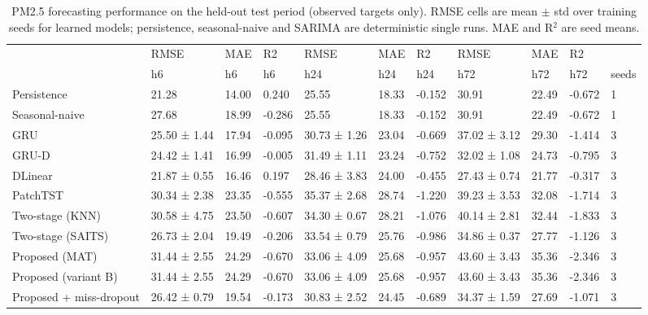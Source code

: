 \begin{table}
\caption{PM2.5 forecasting performance on the held-out test period (observed targets only). RMSE cells are mean $\pm$ std over training seeds for learned models; persistence, seasonal-naive and SARIMA are deterministic single runs. MAE and R$^2$ are seed means.}
\label{tab:main_results}
\begin{tabular}{lllllllllll}
\toprule
 & RMSE & MAE & R2 & RMSE & MAE & R2 & RMSE & MAE & R2 &  \\
 & h6 & h6 & h6 & h24 & h24 & h24 & h72 & h72 & h72 & seeds \\
\midrule
Persistence & 21.28 & 14.00 & 0.240 & 25.55 & 18.33 & -0.152 & 30.91 & 22.49 & -0.672 & 1 \\
Seasonal-naive & 27.68 & 18.99 & -0.286 & 25.55 & 18.33 & -0.152 & 30.91 & 22.49 & -0.672 & 1 \\
GRU & 25.50 ± 1.44 & 17.94 & -0.095 & 30.73 ± 1.26 & 23.04 & -0.669 & 37.02 ± 3.12 & 29.30 & -1.414 & 3 \\
GRU-D & 24.42 ± 1.41 & 16.99 & -0.005 & 31.49 ± 1.11 & 23.24 & -0.752 & 32.02 ± 1.08 & 24.73 & -0.795 & 3 \\
DLinear & 21.87 ± 0.55 & 16.46 & 0.197 & 28.46 ± 3.83 & 24.00 & -0.455 & 27.43 ± 0.74 & 21.77 & -0.317 & 3 \\
PatchTST & 30.34 ± 2.38 & 23.35 & -0.555 & 35.37 ± 2.68 & 28.74 & -1.220 & 39.23 ± 3.53 & 32.08 & -1.714 & 3 \\
Two-stage (KNN) & 30.58 ± 4.75 & 23.50 & -0.607 & 34.30 ± 0.67 & 28.21 & -1.076 & 40.14 ± 2.81 & 32.44 & -1.833 & 3 \\
Two-stage (SAITS) & 26.73 ± 2.04 & 19.49 & -0.206 & 33.54 ± 0.79 & 25.76 & -0.986 & 34.86 ± 0.37 & 27.77 & -1.126 & 3 \\
Proposed (MAT) & 31.44 ± 2.55 & 24.29 & -0.670 & 33.06 ± 4.09 & 25.68 & -0.957 & 43.60 ± 3.43 & 35.36 & -2.346 & 3 \\
Proposed (variant B) & 31.44 ± 2.55 & 24.29 & -0.670 & 33.06 ± 4.09 & 25.68 & -0.957 & 43.60 ± 3.43 & 35.36 & -2.346 & 3 \\
Proposed + miss-dropout & 26.42 ± 0.79 & 19.54 & -0.173 & 30.83 ± 2.52 & 24.45 & -0.689 & 34.37 ± 1.59 & 27.69 & -1.071 & 3 \\
\bottomrule
\end{tabular}
\end{table}
